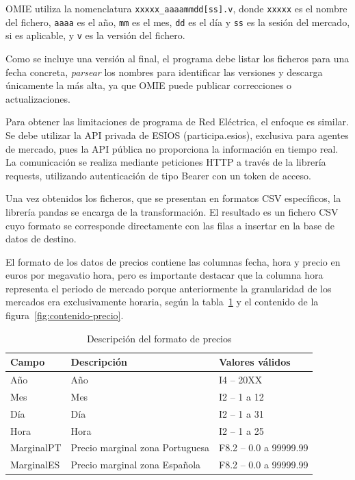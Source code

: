 OMIE utiliza la nomenclatura \texttt{xxxxx\_aaaammdd[ss].v}, donde \texttt{xxxxx} es el nombre del fichero, \texttt{aaaa} es el año, \texttt{mm} es el mes, \texttt{dd} es el día y \texttt{ss} es la sesión del mercado, si es aplicable, y \texttt{v} es la versión del fichero.

Como se incluye una versión al final, el programa debe listar los ficheros para una fecha concreta, \textit{parsear} los nombres para identificar las versiones y descarga únicamente la más alta, ya que OMIE puede publicar correcciones o actualizaciones.

Para obtener las limitaciones de programa de Red Eléctrica, el enfoque es similar. Se debe utilizar la API privada de ESIOS (participa.esios), exclusiva para agentes de mercado, pues la API pública no proporciona la información en tiempo real. La comunicación se realiza mediante peticiones HTTP a través de la librería requests, utilizando autenticación de tipo Bearer con un token de acceso.

Una vez obtenidos los ficheros, que se presentan en formatos CSV específicos, la librería pandas se encarga de la transformación. El resultado es un fichero CSV cuyo formato se corresponde directamente con las filas a insertar en la base de datos de destino.

El formato de los datos de precios contiene las columnas fecha, hora y precio en euros por megavatio hora, pero es importante destacar que la columna hora representa el periodo de mercado porque anteriormente la granularidad de los mercados era exclusivamente horaria, según la tabla~\ref{tab:descripción-precio} y el contenido de la figura~\ref{fig:contenido-precio}.

\begin{table}[ht]
\centering
\begin{tabular}{|l|p{7.5cm}|l|}
\hline
Campo & Descripción & Valores válidos \\
\hline
Año & Año & I4 -- 20XX \\
Mes & Mes & I2 -- 1 a 12 \\
Día & Día & I2 -- 1 a 31 \\
Hora & Hora & I2 -- 1 a 25 \\
MarginalPT & Precio marginal zona Portuguesa & F8.2 -- 0.0 a 99999.99 \\
MarginalES & Precio marginal zona Española & F8.2 -- 0.0 a 99999.99 \\
\hline
\end{tabular}
\caption{Descripción del formato de precios}
\label{tab:descripción-precio}
\end{table}
    
